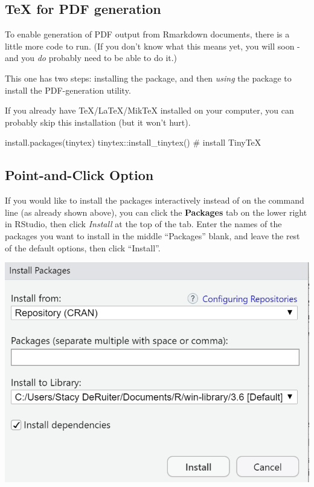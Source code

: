 \documentclass[
  letterpaper,
  DIV=11,
  numbers=noendperiod]{scrreprt}
\newenvironment{Shaded}{\begin{snugshade}}{\end{snugshade}}
\newcommand{\CommentTok}[1]{\textcolor[rgb]{0.37,0.37,0.37}{#1}}
\newcommand{\FunctionTok}[1]{\textcolor[rgb]{0.28,0.35,0.67}{#1}}
\newcommand{\NormalTok}[1]{\textcolor[rgb]{0.00,0.23,0.31}{#1}}
\newcommand{\SpecialCharTok}[1]{\textcolor[rgb]{0.37,0.37,0.37}{#1}}
\newcommand{\StringTok}[1]{\textcolor[rgb]{0.13,0.47,0.30}{#1}}
\theoremstyle{remark}
\begin{document}
\subsection{TeX for PDF generation}\label{tex-for-pdf-generation}

To enable generation of PDF output from Rmarkdown documents, there is a
little more code to run. (If you don't know what this means yet, you
will soon - and you \emph{do} probably need to be able to do it.)

This one has two steps: installing the package, and then \emph{using}
the package to install the PDF-generation utility.

If you already have TeX/LaTeX/MikTeX installed on your computer, you can
probably skip this installation (but it won't hurt).

\begin{Shaded}
\begin{Highlighting}[]
\FunctionTok{install.packages}\NormalTok{(}\StringTok{\textquotesingle{}tinytex\textquotesingle{}}\NormalTok{)}
\NormalTok{tinytex}\SpecialCharTok{::}\FunctionTok{install\_tinytex}\NormalTok{()  }\CommentTok{\# install TinyTeX}
\end{Highlighting}
\end{Shaded}

\subsection{Point-and-Click Option}\label{point-and-click-option}

If you would like to install the packages interactively instead of on
the command line (as already shown above), you can click the
\textbf{Packages} tab on the lower right in RStudio, then click
\emph{Install} at the top of the tab. Enter the names of the packages
you want to install in the middle ``Packages'' blank, and leave the rest
of the default options, then click ``Install''.

\includegraphics[width=0.85\linewidth,height=\textheight,keepaspectratio]{images/install-interactive.png}
\end{document}
